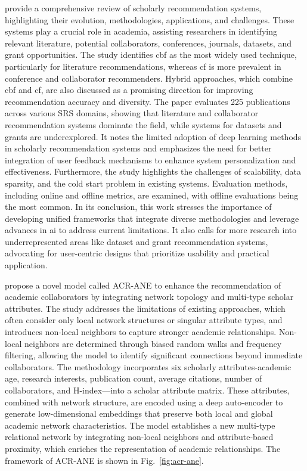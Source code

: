 \textcite{Zhang2023} provide a comprehensive review of scholarly recommendation systems, highlighting their evolution, methodologies, applications, and challenges.
These systems play a crucial role in academia, assisting researchers in identifying relevant literature, potential collaborators, conferences, journals, datasets, and grant opportunities.
The study identifies \gls{cbf} as the most widely used technique, particularly for literature recommendations, whereas \gls{cf} is more prevalent in conference and collaborator recommenders.
Hybrid approaches, which combine \gls{cbf} and \gls{cf}, are also discussed as a promising direction for improving recommendation accuracy and diversity.
The paper evaluates 225 publications across various SRS domains, showing that literature and collaborator recommendation systems dominate the field, while systems for datasets and grants are underexplored.
It notes the limited adoption of deep learning methods in scholarly recommendation systems and emphasizes the need for better integration of user feedback mechanisms to enhance system personalization and effectiveness.
Furthermore, the study highlights the challenges of scalability, data sparsity, and the cold start problem in existing systems.
Evaluation methods, including online and offline metrics, are examined, with offline evaluations being the most common.
In its conclusion, this work stresses the importance of developing unified frameworks that integrate diverse methodologies and leverage advances in \gls{ai} to address current limitations.
It also calls for more research into underrepresented areas like dataset and grant recommendation systems, advocating for user-centric designs that prioritize usability and practical application.

\textcite{Du2022} propose a novel model called ACR-ANE to enhance the recommendation of academic collaborators by integrating network topology and multi-type scholar attributes.
The study addresses the limitations of existing approaches, which often consider only local network structures or singular attribute types, and introduces non-local neighbors to capture stronger academic relationships.
Non-local neighbors are determined through biased random walks and frequency filtering, allowing the model to identify significant connections beyond immediate collaborators.
The methodology incorporates six scholarly attributes-academic age, research interests, publication count, average citations, number of collaborators, and H-index—into a scholar attribute matrix.
These attributes, combined with network structure, are encoded using a deep auto-encoder to generate low-dimensional embeddings that preserve both local and global academic network characteristics.
The model establishes a new multi-type relational network by integrating non-local neighbors and attribute-based proximity, which enriches the representation of academic relationships.
The framework of ACR-ANE is shown in Fig.~\ref{fig:acr-ane}.

